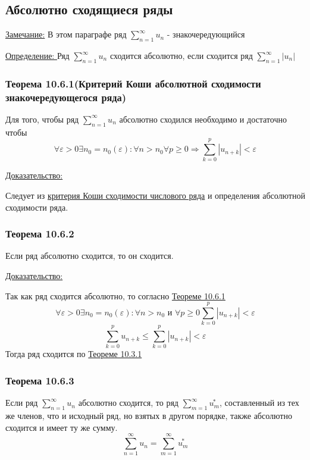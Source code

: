 \documentclass[12pt]{article}
\let\oldsum\sum
\renewcommand{\sum}{\oldsum\limits}
\begin{document}
  \subsection{Абсолютно сходящиеся ряды}
  \underline{Замечание:} В этом параграфе ряд $\sum_{n=1}^{\infty} u_n$ - знакочередующийся

  \underline{Определение: } Ряд $\sum_{n=1}^{\infty} u_n$ сходится абсолютно, если сходится ряд $\sum_{n=1}^{\infty} |u_n|$

  \subsubsection*{Теорема 10.6.1(Критерий Коши абсолютной сходимости знакочередующегося ряда)}\label{th:10.6.1}
  \par\noindent
  Для того, чтобы ряд $\sum_{n=1}^{\infty} u_n$ абсолютно сходился необходимо и достаточно чтобы 
  \[ \forall \varepsilon > 0 \exists n_0 = n_0(\varepsilon): \forall n > n_0 \forall p \geq 0 \Rightarrow \sum_{k=0}^{p} |u_{n+k}| < \varepsilon\]

  \underline{Доказательство:}
  \begin{adjustwidth}{1.5em}{1.5em}
    Следует из \hyperref[th:10.3.1]{критерия Коши сходимости числового ряда} и определения абсолютной 
    сходимости ряда.
  \end{adjustwidth}
  
  \subsubsection*{Теорема 10.6.2}\label{th:10.6.2}
  \par\noindent
  Если ряд абсолютно сходится, то он сходится.

  \underline{Доказательство:}
  \begin{adjustwidth}{1.5em}{1.5em}
    Так как ряд сходится абсолютно, то согласно \hyperref[th:10.6.1]{Теореме 10.6.1}
    \[\forall \varepsilon > 0 \exists n_0 = n_0(\varepsilon): \forall n>n_0 \text{ и } \forall p \geq 0
    \sum_{k=0}^{p} |u_{n+k}| < \varepsilon\]
    \[\sum_{k=0}^{p} u_{n+k} \leq \sum_{k=0}^{p} |u_{n+k}| < \varepsilon\]
    Тогда ряд сходится по \hyperref[th:10.3.1]{Теореме 10.3.1}
  \end{adjustwidth}

  \subsubsection*{Теорема 10.6.3}\label{th:10.6.3}
  \par\noindent
  Если ряд $\sum_{n=1}^{\infty} u_n$ абсолютно сходится, то ряд $\sum_{m=1}^{\infty} \overset{*}{u_m}$,
  составленный из тех же членов, что и исходный ряд, но взятых в другом порядке, также абсолютно сходится и 
  имеет ту же сумму.
  \[\sum_{n=1}^{\infty} u_n = \sum_{m=1}^{\infty} \overset{*}{u_m}\]
\end{document}

